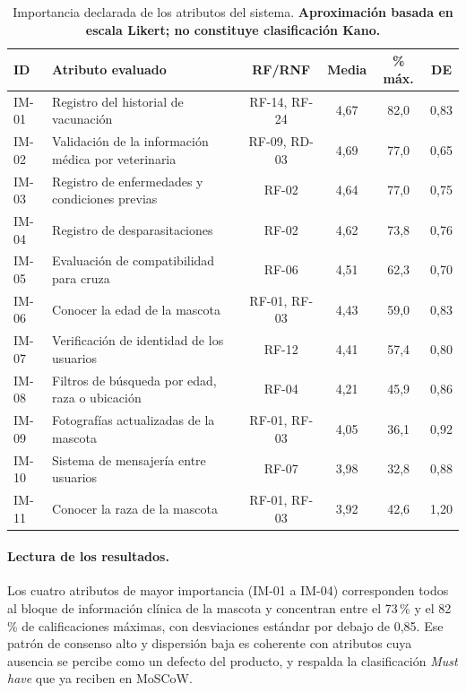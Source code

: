 \documentclass[journal,onecolumn]{IEEEtran}
\begin{document}
	\begin{table}[H]
		\centering
		\caption[Importancia declarada de los atributos (aproximación, no Kano)]{Importancia declarada de los atributos del sistema. \textbf{Aproximación basada en escala Likert; no constituye clasificación Kano.}}
		\label{tab:importancia-declarada}
		\small
		\begin{tabularx}{\textwidth}{@{}l X c c c c@{}}
			\toprule
			\textbf{ID} & \textbf{Atributo evaluado} & \textbf{RF/RNF} & \textbf{Media} & \textbf{\% máx.} & \textbf{DE} \\
			\midrule
			IM-01 & Registro del historial de vacunación & RF-14, RF-24 & 4,67 & 82,0 & 0,83 \\
			IM-02 & Validación de la información médica por veterinaria & RF-09, RD-03 & 4,69 & 77,0 & 0,65 \\
			IM-03 & Registro de enfermedades y condiciones previas & RF-02 & 4,64 & 77,0 & 0,75 \\
			IM-04 & Registro de desparasitaciones & RF-02 & 4,62 & 73,8 & 0,76 \\
			IM-05 & Evaluación de compatibilidad para cruza & RF-06 & 4,51 & 62,3 & 0,70 \\
			IM-06 & Conocer la edad de la mascota & RF-01, RF-03 & 4,43 & 59,0 & 0,83 \\
			IM-07 & Verificación de identidad de los usuarios & RF-12 & 4,41 & 57,4 & 0,80 \\
			IM-08 & Filtros de búsqueda por edad, raza o ubicación & RF-04 & 4,21 & 45,9 & 0,86 \\
			IM-09 & Fotografías actualizadas de la mascota & RF-01, RF-03 & 4,05 & 36,1 & 0,92 \\
			IM-10 & Sistema de mensajería entre usuarios & RF-07 & 3,98 & 32,8 & 0,88 \\
			IM-11 & Conocer la raza de la mascota & RF-01, RF-03 & 3,92 & 42,6 & 1,20 \\
			\bottomrule
		\end{tabularx}
	\end{table}
	
	\paragraph{Lectura de los resultados.}
	Los cuatro atributos de mayor importancia (IM-01 a IM-04) corresponden todos
	al bloque de información clínica de la mascota y concentran entre el 73\,\%
	y el 82\,\% de calificaciones máximas, con desviaciones estándar por debajo
	de 0,85. Ese patrón de consenso alto y dispersión baja es coherente con
	atributos cuya ausencia se percibe como un defecto del producto, y respalda
	la clasificación \emph{Must have} que ya reciben en MoSCoW.
	
\end{document}
